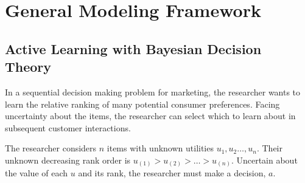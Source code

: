 \documentclass[a4paper,11pt]{article}
\newcommand{\numitems}{n}
\begin{document}










\section{General Modeling Framework}


\subsection{Active Learning with Bayesian Decision Theory}

In a sequential decision making problem for marketing, the researcher wants to learn the relative ranking of many potential consumer preferences. Facing uncertainty about the items, the researcher can select which to learn about in subsequent customer interactions.

The researcher considers $\numitems$ items with unknown utilities $u_1,u_2 \ldots, u_\numitems$. Their unknown decreasing rank order is $u_{(1)} > u_{(2)} > \ldots > u_{(\numitems)}$. Uncertain about the value of each $u$ and its rank, the researcher must make a decision, $a$. 
\end{document}
